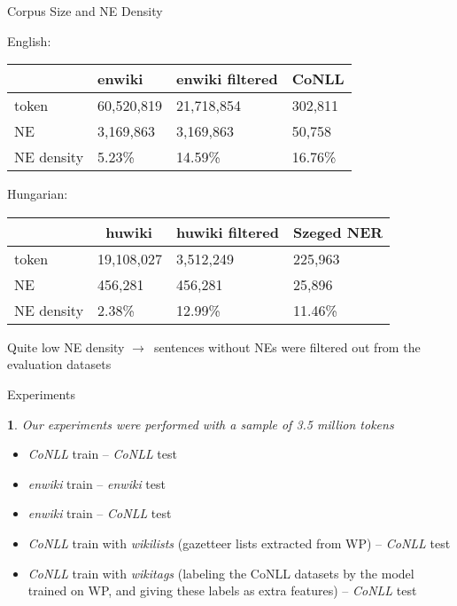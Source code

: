 \documentclass[utf8x,t]{beamer}
\newcommand{\nyil}{$\rightarrow$\ }
\newtheorem{nix}{}[section]
\begin{document}
\begin{frame}{Corpus Size and NE Density}

English: 

\begin{center}
\begin{tabular}{llll}
\hline  & \bf enwiki & \bf enwiki filtered & \bf CoNLL \\ \hline
token & 60,520,819 & 21,718,854 & 302,811 \\
NE & 3,169,863 & 3,169,863 & 50,758 \\
NE density & 5.23\% & 14.59\% & 16.76\% \\ \hline
\end{tabular}
\end{center}


Hungarian:

\begin{center}
\begin{tabular}{llll}
\hline  & \bf huwiki & \bf huwiki filtered  & \bf Szeged NER \\ \hline
token & 19,108,027 & 3,512,249  & 225,963 \\
NE & 456,281 & 456,281  & 25,896 \\
NE density & 2.38\% & 12.99\%  & 11.46\% \\ \hline 
\end{tabular}
\end{center}

Quite low NE density \nyil sentences without NEs were filtered out from the evaluation datasets

\end{frame}

\begin{frame}{Experiments}

\begin{nix}
Our experiments were performed with a sample of 3.5 million tokens
\end{nix}

\bigskip

\begin{itemize}
\item \textit{CoNLL} train -- \textit{CoNLL} test
\item \textit{enwiki} train -- \textit{enwiki} test
\item \textit{enwiki} train -- \textit{CoNLL} test
\item \textit{CoNLL} train with \textit{wikilists} (gazetteer lists extracted from WP) -- \textit{CoNLL} test
\item \textit{CoNLL} train with \textit{wikitags} (labeling the CoNLL datasets by the model trained on WP, and giving these labels as extra features) -- \textit{CoNLL} test
\end{itemize}

\end{frame}
\end{document}
